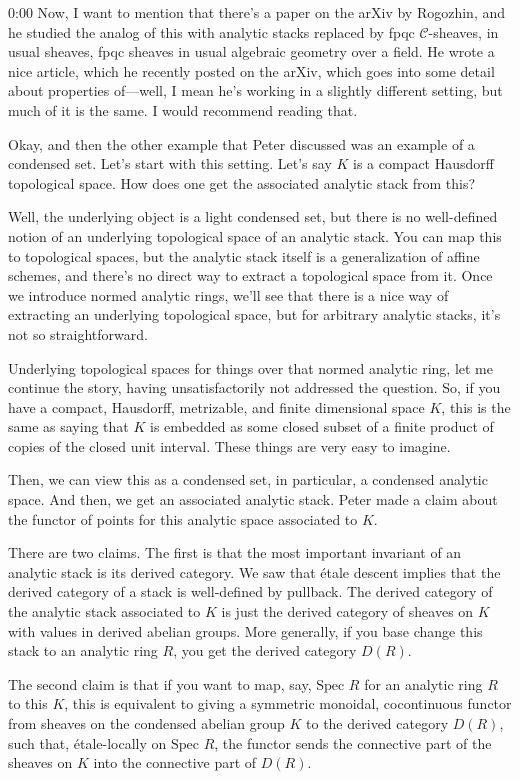 \begin{unfinished}{0:00}
Now, I want to mention that there's a paper on the arXiv by Rogozhin, and he studied the analog of this with analytic stacks replaced by fpqc $\mathcal{C}$-sheaves, in usual sheaves, fpqc sheaves in usual algebraic geometry over a field. He wrote a nice article, which he recently posted on the arXiv, which goes into some detail about properties of---well, I mean he's working in a slightly different setting, but much of it is the same. I would recommend reading that.

Okay, and then the other example that Peter discussed was an example of a condensed set. Let's start with this setting. Let's say $K$ is a compact Hausdorff topological space. How does one get the associated analytic stack from this?

Well, the underlying object is a light condensed set, but there is no well-defined notion of an underlying topological space of an analytic stack. You can map this to topological spaces, but the analytic stack itself is a generalization of affine schemes, and there's no direct way to extract a topological space from it. Once we introduce normed analytic rings, we'll see that there is a nice way of extracting an underlying topological space, but for arbitrary analytic stacks, it's not so straightforward.

Underlying topological spaces for things over that normed analytic ring, let me continue the story, having unsatisfactorily not addressed the question. So, if you have a compact, Hausdorff, metrizable, and finite dimensional space $K$, this is the same as saying that $K$ is embedded as some closed subset of a finite product of copies of the closed unit interval. These things are very easy to imagine.

Then, we can view this as a condensed set, in particular, a condensed analytic space. And then, we get an associated analytic stack. Peter made a claim about the functor of points for this analytic space associated to $K$.

There are two claims. The first is that the most important invariant of an analytic stack is its derived category. We saw that étale descent implies that the derived category of a stack is well-defined by pullback. The derived category of the analytic stack associated to $K$ is just the derived category of sheaves on $K$ with values in derived abelian groups. More generally, if you base change this stack to an analytic ring $R$, you get the derived category $D(R)$.

The second claim is that if you want to map, say, $\text{Spec } R$ for an analytic ring $R$ to this $K$, this is equivalent to giving a symmetric monoidal, cocontinuous functor from sheaves on the condensed abelian group $K$ to the derived category $D(R)$, such that, étale-locally on $\text{Spec } R$, the functor sends the connective part of the sheaves on $K$ into the connective part of $D(R)$.


\end{unfinished}

